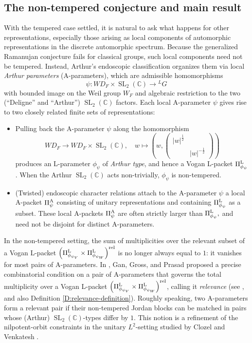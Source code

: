 \documentclass[11pt,letterpaper]{amsart}
\theoremstyle{plain}
\numberwithin{theorem}{section}
\numberwithin{equation}{subsection}
\theoremstyle{remark}
\newcommand{\SL}{\operatorname{SL}}
\newcommand{\C}{\mathbb{C}}
\def\lra{\longrightarrow}
\def\LP{\Pi^{\rm L}} %
\def\AP{\Pi^{\rm A}} %
\def\rel{{\rm rel}} %
\begin{document}
\subsection{The non-tempered conjecture and main result}\label{sub:introNTGGPandMainResult}

With the tempered case settled, it is natural to ask what happens for other representations, especially those arising as local components of automorphic representations in the discrete automorphic spectrum. Because the generalized Ramanujan conjecture fails for classical groups, such local components need not be tempered. Instead, Arthur's endoscopic classification organizes them via local \emph{Arthur parameters} (A-parameters), which are admissible homomorphisms
\[
    \psi : WD_F \times \SL_2(\C) \longrightarrow {}^L G
\]
with bounded image on the Weil group $W_F$ and algebraic restriction to the two (``Deligne'' and ``Arthur'') $\SL_2\left(\C\right)$ factors. Each local A-parameter $\psi$ gives rise to two closely related finite sets of representations:
\begin{itemize}
    \item Pulling back the A-parameter $\psi$ along the homomorphism 
    \[
        WD_F \lra WD_F\times \SL_2\left(\C\right), \quad w\mapsto \left(w,\left(\begin{array}{cc}
                |w|^{\frac{1}{2}} & \\
                 & |w|^{-\frac{1}{2}}
            \end{array}\right)\right)
    \]
    produces an L-parameter $\phi_\psi$ of \emph{Arthur type}, and hence a Vogan L-packet $\LP_{\phi_\psi}$. When the Arthur $\SL_2\left(\C\right)$ acts non-trivially, $\phi_\psi$ is non-tempered.

    \vskip 5pt

    \item (Twisted) endoscopic character relations attach to the A-parameter $\psi$ a local A-packet $\AP_\psi$ consisting of unitary representations and containing $\LP_{\phi_\psi}$ as a subset. These local A-packets $\AP_\psi$ are often strictly larger than $\LP_{\phi_\psi},$ and need not be disjoint for distinct A-parameters.
\end{itemize}
\vskip 5pt
In the non-tempered setting, the sum of multiplicities over the relevant subset of a Vogan L-packet $\left(\LP_{\phi_{\psi_V}} \times \LP_{\phi_{\psi_W}}\right)^\rel$ is no longer always equal to $1$: it vanishes for most pairs of A-parameters.
In \cite{MR4190046}, Gan, Gross, and Prasad proposed a precise combinatorial condition on a pair of A-parameters that governs the total multiplicity over a Vogan L-packet $\left(\LP_{\phi_{\psi_V}} \times \LP_{\phi_{\psi_W}}\right)^\rel$, calling it \emph{relevance} (see \cite[Sect. 3]{MR4190046}, and also Definition \ref{D:relevance-definition}). Roughly speaking, two A-parameters form a relevant pair if their non-tempered Jordan blocks can be matched in pairs whose (Arthur) $\SL_2\left(\C\right)$-types differ by $1$.
This notion is a refinement of the nilpotent-orbit constraints in the unitary $L^2$-setting studied by Clozel and Venkatesh \cite{Clo04, Ven05}.
\end{document}
